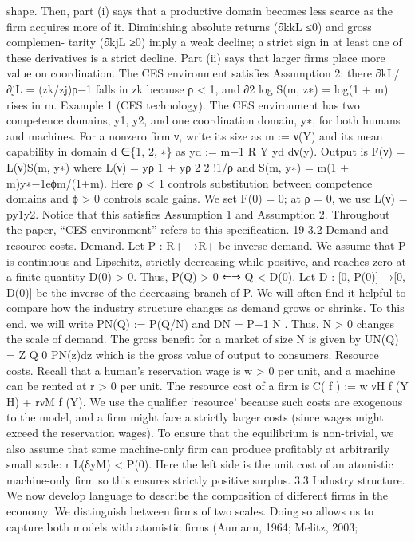 shape. Then, part (i) says that a productive domain becomes less scarce as the firm
acquires more of it. Diminishing absolute returns (∂kkL ≤0) and gross complemen-
tarity (∂kjL ≥0) imply a weak decline; a strict sign in at least one of these derivatives
is a strict decline. Part (ii) says that larger firms place more value on coordination.
The CES environment satisfies Assumption 2: there ∂kL/∂jL = (zk/zj)ρ−1 falls in zk
because ρ < 1, and ∂2 log S(m, z∗) = log(1 + m) rises in m.
Example 1 (CES technology). The CES environment has two competence domains,
y1, y2, and one coordination domain, y∗, for both humans and machines. For a
nonzero firm ν, write its size as m := ν(Y) and its mean capability in domain
d ∈\{1, 2, ∗\} as yd := m−1 R
Y yd dν(y). Output is F(ν) = L(ν)S(m, y∗) where
L(ν) =
yρ
1 + yρ
2
2
!1/ρ
and
S(m, y∗) = m(1 + m)y∗−1eϕm/(1+m).
Here ρ < 1 controls substitution between competence domains and ϕ > 0 controls
scale gains. We set F(0) = 0; at ρ = 0, we use L(ν) = py1y2. Notice that
this satisfies Assumption 1 and Assumption 2. Throughout the paper, “CES
environment” refers to this specification.
19
3.2 Demand and resource costs.
Demand. Let P : R+ →R+ be inverse demand. We assume that P is continuous
and Lipschitz, strictly decreasing while positive, and reaches zero at a finite quantity
D(0) > 0. Thus, P(Q) > 0 ⇐⇒
Q < D(0). Let D : [0, P(0)] →[0, D(0)] be the
inverse of the decreasing branch of P.
We will often find it helpful to compare how the industry structure changes as demand
grows or shrinks. To this end, we will write PN(Q) := P(Q/N) and DN = P−1
N . Thus,
N > 0 changes the scale of demand. The gross benefit for a market of size N is given
by
UN(Q) =
Z Q
0
PN(z)dz
which is the gross value of output to consumers.
Resource costs. Recall that a human’s reservation wage is w > 0 per unit, and a
machine can be rented at r > 0 per unit. The resource cost of a firm is
C( f ) := w νH
f (Y H) + rνM
f (Y).
We use the qualifier ‘resource’ because such costs are exogenous to the model, and a
firm might face a strictly larger costs (since wages might exceed the reservation wages).
To ensure that the equilibrium is non-trivial, we also assume that some machine-only
firm can produce profitably at arbitrarily small scale:
r
L(δyM) < P(0). Here the left
side is the unit cost of an atomistic machine-only firm so this ensures strictly positive
surplus.
3.3 Industry structure. We now develop language to describe the composition of
different firms in the economy. We distinguish between firms of two scales. Doing so
allows us to capture both models with atomistic firms (Aumann, 1964; Melitz, 2003;
